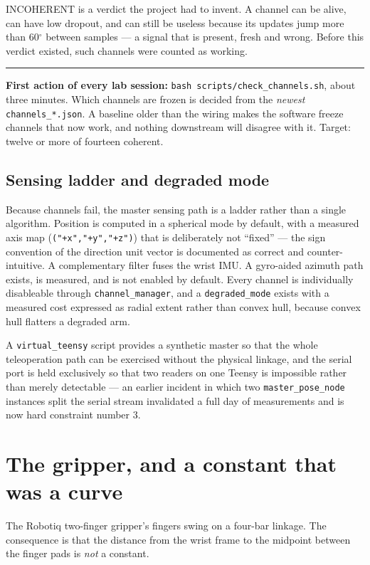 \documentclass[11pt,a4paper,oneside]{report}
\newcommand{\code}[1]{\texttt{\small #1}}
\newcommand{\file}[1]{\texttt{\small #1}}
\newcommand{\dg}{$^{\circ}$}
\newcommand{\keyfact}[1]{%
  \par\vspace{7pt}\noindent
  \hspace*{0pt}\textcolor{srlblue}{\rule{2.5pt}{\dimexpr\baselineskip\relax}}%
  \hspace{9pt}%
  \begin{minipage}[t]{\dimexpr\textwidth-14pt\relax}
  \small #1
  \end{minipage}\par\vspace{7pt}}
\begin{document}
INCOHERENT is a verdict the project had to invent. A channel can be alive, can
have low dropout, and can still be useless because its updates jump more than
60\dg{} between samples --- a signal that is present, fresh and wrong. Before
this verdict existed, such channels were counted as working.

\keyfact{\textbf{First action of every lab session:} \code{bash
scripts/check\_channels.sh}, about three minutes. Which channels are frozen is
decided from the \emph{newest} \file{channels\_*.json}. A baseline older than
the wiring makes the software freeze channels that now work, and nothing
downstream will disagree with it. Target: twelve or more of fourteen coherent.}

\subsection{Sensing ladder and degraded mode}

Because channels fail, the master sensing path is a ladder rather than a single
algorithm. Position is computed in a spherical mode by default, with a measured
axis map (\code{("+x","+y","+z")}) that is deliberately not ``fixed'' --- the
sign convention of the direction unit vector is documented as correct and
counter-intuitive. A complementary filter fuses the wrist IMU. A gyro-aided
azimuth path exists, is measured, and is not enabled by default. Every channel
is individually disableable through \code{channel\_manager}, and a
\code{degraded\_mode} exists with a measured cost expressed as radial extent
rather than convex hull, because convex hull flatters a degraded arm.

A \code{virtual\_teensy} script provides a synthetic master so that the whole
teleoperation path can be exercised without the physical linkage, and the
serial port is held exclusively so that two readers on one Teensy is
impossible rather than merely detectable --- an earlier incident in which two
\code{master\_pose\_node} instances split the serial stream invalidated a full
day of measurements and is now hard constraint number 3.

\section{The gripper, and a constant that was a curve}

The Robotiq two-finger gripper's fingers swing on a four-bar linkage. The
consequence is that the distance from the wrist frame to the midpoint between
the finger pads is \emph{not} a constant.
\end{document}
